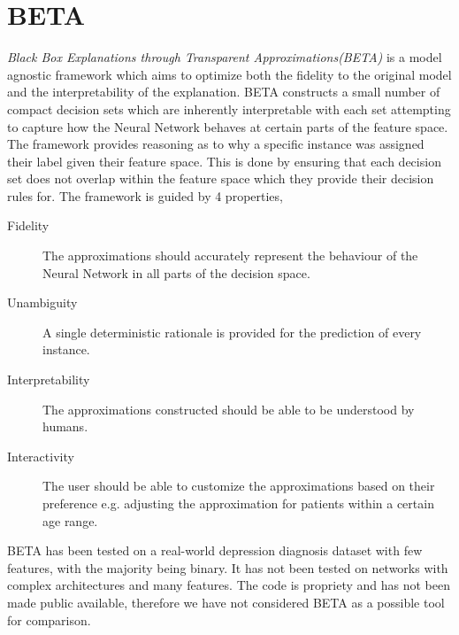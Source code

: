 \section{BETA}
\emph{Black Box Explanations through Transparent Approximations(BETA)} \cite{DBLP:journals/corr/LakkarajuKCL17} is a model agnostic framework which aims to optimize both the fidelity to the original model and the interpretability of the explanation. BETA constructs a small number of compact decision sets which are inherently interpretable \cite{inproceedingsb}  with each set attempting to capture how the Neural Network behaves at certain parts of the feature space. The framework provides reasoning as to why a specific instance was assigned their label given their feature space. This is done by ensuring that each decision set does not overlap within the feature space which they provide their decision rules for. The framework is guided by 4 properties,

\begin{description}
    \item[Fidelity] The approximations should accurately represent the behaviour of the Neural Network in all parts of the decision space.
    \item[Unambiguity] A single deterministic rationale is provided for the prediction of every instance.
    \item[Interpretability] The approximations constructed should be able to be understood by humans.
    \item[Interactivity] The user should be able to customize the approximations based on their preference e.g. adjusting the approximation for patients within a certain age range.
\end{description}
BETA has been tested on a real-world depression diagnosis dataset with few features, with the majority being binary. It has not been tested on networks with complex architectures and many features. The code is propriety and has not been made public available, therefore we have not considered BETA as a possible tool for comparison.



